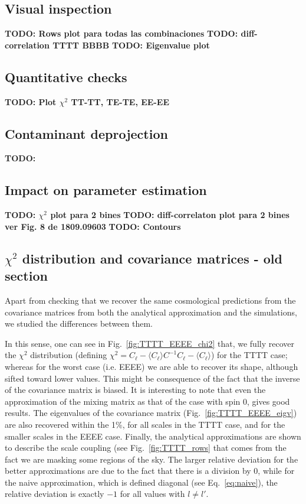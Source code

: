 \documentclass[a4paper,11pt]{article}
\newcommand{\todo}[1]{{\bf TODO: #1}}
\newcommand{\cl}{C_\ell}
\begin{document}
\subsection{Visual inspection}
\todo{Rows plot para todas las combinaciones}
\todo{diff-correlation TTTT BBBB}
\todo{Eigenvalue plot}

\subsection{Quantitative checks}
\todo{Plot $\chi^2$ TT-TT, TE-TE, EE-EE}

\subsection{Contaminant deprojection}
\todo{}

\subsection{Impact on parameter estimation}
\todo{$\chi^2$ plot para 2 bines}
\todo{diff-correlaton plot para 2 bines ver Fig. 8  de 1809.09603}
\todo{Contours}

\subsection{$\chi^2$ distribution and covariance matrices - old section}
Apart from checking that we recover the same cosmological predictions from the
covariance matrices from both the analytical approximation and the
simulations, we studied the differences between them.

In this sense, one can see in Fig.~\ref{fig:TTTT_EEEE_chi2} that, we fully
recover the $\chi^2$ distribution (defining $\chi^2 = \cl - \langle \cl
\rangle C^{-1} \cl - \langle \cl \rangle$) for the TTTT case; whereas for the
worst case (i.e. EEEE) we are able to recover its shape, although sifted
toward lower values. This might be consequence of the fact that the inverse of
the covariance matrix is biased. It is interesting to note that even
the approximation of the mixing matrix as that of the case with spin 0, gives
good results. The eigenvalues of the covariance matrix
(Fig.~\ref{fig:TTTT_EEEE_eigv}) are also recovered within the 1\%, for all
scales in the TTTT case, and for the smaller scales in the EEEE case. Finally,
the analytical approximations are shown to describe the scale coupling (see
Fig.~\ref{fig:TTTT_rows} that comes from the fact we are masking some regions
of the sky. The larger relative deviation for the better approximations are
due to the fact that there is a division by $0$, while for the naive
approximation, which is defined diagonal (see Eq.~\ref{eq:naive}), the
relative deviation is exactly $-1$ for all values with $l \neq l'$.
\end{document}
